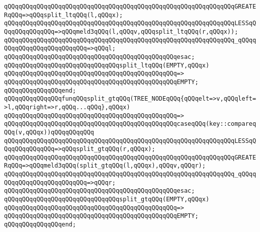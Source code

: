 \verb|qQQqqQQqqQQqqQQqqQQqqQQqqQQqqQQqqQQqqQQqqQQqqQQqqQQqqQQqqQQqqQQqGREATERqQQq=>qQQqsplit_ltqQQq(l,qQQqx);|\newline
\verb|qQQqqQQqqQQqqQQqqQQqqQQqqQQqqQQqqQQqqQQqqQQqqQQqqQQqqQQqqQQqqQQqLESSqQQqqQQqqQQqqQQq=>qQQqmeld3qQQq(l,qQQqv,qQQqsplit_ltqQQq(r,qQQqx));|\newline
\verb|qQQqqQQqqQQqqQQqqQQqqQQqqQQqqQQqqQQqqQQqqQQqqQQqqQQqqQQqqQQqqQQq_qQQqqQQqqQQqqQQqqQQqqQQqqQQq=>qQQql;|\newline
\verb|qQQqqQQqqQQqqQQqqQQqqQQqqQQqqQQqqQQqqQQqqQQqqQQqesac;|\newline
\newline
\verb|qQQqqQQqqQQqqQQqqQQqqQQqqQQqqQQqsplit_ltqQQq(EMPTY,qQQqx)|\newline
\verb|qQQqqQQqqQQqqQQqqQQqqQQqqQQqqQQqqQQqqQQqqQQqqQQq=>|\newline
\verb|qQQqqQQqqQQqqQQqqQQqqQQqqQQqqQQqqQQqqQQqqQQqqQQqEMPTY;|\newline
\verb|qQQqqQQqqQQqqQQqend;|\newline
\newline
\newline
\verb|qQQqqQQqqQQqqQQqfunqQQqsplit_gtqQQq(TREE_NODEqQQq{qQQqelt=>v,qQQqleft=>l,qQQqright=>r,qQQq...qQQq},qQQqx)|\newline
\verb|qQQqqQQqqQQqqQQqqQQqqQQqqQQqqQQqqQQqqQQqqQQqqQQq=>|\newline
\verb|qQQqqQQqqQQqqQQqqQQqqQQqqQQqqQQqqQQqqQQqqQQqqQQqcaseqQQq(key::compareqQQq(v,qQQqx))qQQqqQQqqQQq|\newline
\verb|qQQqqQQqqQQqqQQqqQQqqQQqqQQqqQQqqQQqqQQqqQQqqQQqqQQqqQQqqQQqqQQqLESSqQQqqQQqqQQqqQQq=>qQQqsplit_gtqQQq(r,qQQqx);|\newline
\verb|qQQqqQQqqQQqqQQqqQQqqQQqqQQqqQQqqQQqqQQqqQQqqQQqqQQqqQQqqQQqqQQqGREATERqQQq=>qQQqmeld3qQQq(split_gtqQQq(l,qQQqx),qQQqv,qQQqr);|\newline
\verb|qQQqqQQqqQQqqQQqqQQqqQQqqQQqqQQqqQQqqQQqqQQqqQQqqQQqqQQqqQQqqQQq_qQQqqQQqqQQqqQQqqQQqqQQqqQQq=>qQQqr;|\newline
\verb|qQQqqQQqqQQqqQQqqQQqqQQqqQQqqQQqqQQqqQQqqQQqqQQqesac;|\newline
\newline
\verb|qQQqqQQqqQQqqQQqqQQqqQQqqQQqqQQqsplit_gtqQQq(EMPTY,qQQqx)|\newline
\verb|qQQqqQQqqQQqqQQqqQQqqQQqqQQqqQQqqQQqqQQqqQQqqQQq=>|\newline
\verb|qQQqqQQqqQQqqQQqqQQqqQQqqQQqqQQqqQQqqQQqqQQqqQQqEMPTY;|\newline
\verb|qQQqqQQqqQQqqQQqend;|\newline
